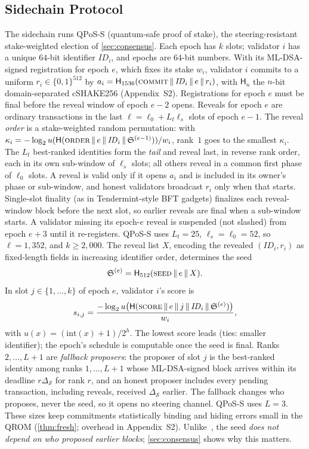 \documentclass[10pt,journal,compsoc]{IEEEtran}
\theoremstyle{tplain}
\theoremstyle{tdef}
\theoremstyle{remark}
\newcommand{\supp}[1]{Appendix~#1}
\newcommand{\Hash}{\mathsf{H}}
\newcommand{\cS}{\mathfrak{S}}
\begin{document}
\subsection{Sidechain Protocol}
The sidechain runs QPoS-S (quantum-safe proof of stake), the steering-resistant stake-weighted election of \cref{sec:consensus}. Each epoch has $k$ slots; validator $i$ has a unique $64$-bit identifier $\mathit{ID}_i$, and epochs are $64$-bit numbers. With its ML-DSA-signed registration for epoch $e$, which fixes its stake $w_i$, validator $i$ commits to a uniform $r_i\in\{0,1\}^{512}$ by $a_i=\Hash_{1536}(\textsc{commit}\,\|\,\mathit{ID}_i\,\|\,e\,\|\,r_i)$, with $\Hash_n$ the $n$-bit domain-separated cSHAKE256 (\supp{S2}). Registrations for epoch $e$ must be final before the reveal window of epoch $e-2$ opens. Reveals for epoch $e$ are ordinary transactions in the last $\ell=\ell_0+L_t\ell_s$ slots of epoch $e-1$. The reveal \emph{order} is a stake-weighted random permutation: with $\kappa_i=-\log_2 u(\Hash(\textsc{order}\,\|\,e\,\|\,\mathit{ID}_i\,\|\,\cS^{(e-1)}))/w_i$, rank~$1$ goes to the smallest $\kappa_i$. The $L_t$ best-ranked identities form the \emph{tail} and reveal last, in reverse rank order, each in its own sub-window of $\ell_s$ slots; all others reveal in a common first phase of $\ell_0$ slots. A reveal is valid only if it opens $a_i$ and is included in its owner's phase or sub-window, and honest validators broadcast $r_i$ only when that starts. Single-slot finality (as in Tendermint-style BFT gadgets) finalizes each reveal-window block before the next slot, so earlier reveals are final when a sub-window starts. A validator missing its epoch-$e$ reveal is suspended (not slashed) from epoch $e+3$ until it re-registers. QPoS-S uses $L_t=25$, $\ell_s=\ell_0=52$, so $\ell=1{,}352$, and $k\ge2{,}000$. The reveal list $X$, encoding the revealed $(\mathit{ID}_i,r_i)$ as fixed-length fields in increasing identifier order, determines the seed
\begin{equation}\label{eq:schedule}
\cS^{(e)}=\Hash_{512}(\textsc{seed}\,\|\,e\,\|\,X).
\end{equation}
In slot $j\in\{1,\dots,k\}$ of epoch $e$, validator $i$'s score is
\begin{equation}\label{eq:score}
s_{i,j}=\frac{-\log_2 u\big(\Hash(\textsc{score}\,\|\,e\,\|\,j\,\|\,\mathit{ID}_i\,\|\,\cS^{(e)})\big)}{w_i},
\end{equation}
with $u(x)=(\mathrm{int}(x)+1)/2^{h}$. The lowest score leads (ties: smaller identifier); the epoch's schedule is computable once the seed is final. Ranks $2,\dots,L+1$ are \emph{fallback proposers}: the proposer of slot $j$ is the best-ranked identity among ranks $1,\dots,L+1$ whose ML-DSA-signed block arrives within its deadline $r\Delta_{\mathcal S}$ for rank $r$, and an honest proposer includes every pending transaction, including reveals, received $\Delta_{\mathcal S}$ earlier. The fallback changes who proposes, never the seed, so it opens no steering channel. QPoS-S uses $L=3$. These sizes keep commitments statistically binding and hiding errors small in the QROM (\cref{thm:fresh}; overhead in \supp{S2}). Unlike~\cite{QRL,myeprint,NIROPoK2025}, the seed \emph{does not depend on who proposed earlier blocks}; \cref{sec:consensus} shows why this matters.
\end{document}
